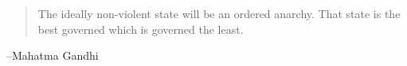 \documentclass[letterpaper, landscape]{exam}
\begin{document}
  \else
    \vspace{10 cm}
    \begin{quote}
      \begin{em}
        The ideally non-violent state will be an ordered anarchy. That state is
        the best governed which is governed the least.
      \end{em}
    \end{quote}
    \hspace{2 cm} --Mahatma Gandhi
  \fi
\end{document}
